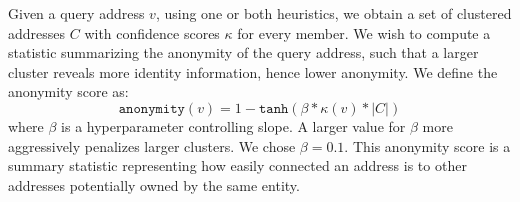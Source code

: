Given a query address $v$, using one or both heuristics, we obtain a set of clustered addresses $C$ with confidence scores $\kappa$ for every member. We wish to compute a statistic summarizing the anonymity of the query address, such that a larger cluster reveals more identity information, hence lower anonymity. We define the anonymity score as:
\begin{equation}
\texttt{anonymity}(v) = 1 - \texttt{tanh}(\beta * \kappa(v) * |C|)
\label{eq:anonymity}
\end{equation}
where $\beta$ is a hyperparameter controlling slope. A larger value for $\beta$ more aggressively penalizes larger clusters. We chose $\beta = 0.1$. This anonymity score is a summary statistic representing how easily connected an address is to other addresses potentially owned by the same entity.
